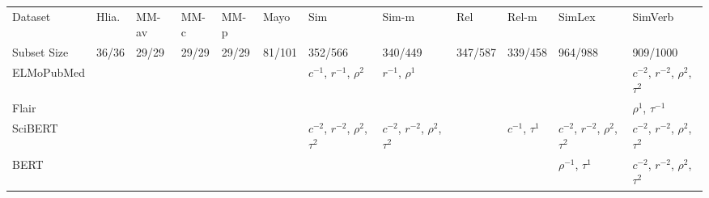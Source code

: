 \documentclass[letterpaper]{article} %
\begin{document}
\begin{sidewaystable*}
    \centering
    \small
    \begin{tabular}{l l l l l l l l l l l l}
    \toprule
         Dataset & Hlia. & MM-av & MM-c & MM-p & Mayo & Sim & Sim-m & Rel & Rel-m & SimLex & SimVerb\\ 
Subset Size & 36/36 & 29/29 & 29/29 & 29/29 & 81/101 & 352/566 & 340/449 & 347/587 & 339/458 & 964/988 & 909/1000\\
\midrule
\multirow{4}{1.5cm}{ELMoPubMed} & \multirow{4}{1.5cm}{} & \multirow{4}{1.5cm}{} & \multirow{4}{1.5cm}{} & \multirow{4}{1.5cm}{} & \multirow{4}{1.5cm}{} & \multirow{4}{1.5cm}{$c^{-1}$, $r^{-1}$, $\rho^{2}$} & \multirow{4}{1.5cm}{$r^{-1}$, $\rho^{1}$} & \multirow{4}{1.5cm}{} & \multirow{4}{1.5cm}{} & \multirow{4}{1.5cm}{} & \multirow{4}{1.5cm}{$c^{-2}$, $r^{-2}$, $\rho^{2}$, $\tau^{2}$} \\ \\ \\ \\
\midrule
\multirow{2}{1.5cm}{Flair} & \multirow{2}{1.5cm}{} & \multirow{2}{1.5cm}{} & \multirow{2}{1.5cm}{} & \multirow{2}{1.5cm}{} & \multirow{2}{1.5cm}{} & \multirow{2}{1.5cm}{} & \multirow{2}{1.5cm}{} & \multirow{2}{1.5cm}{} & \multirow{2}{1.5cm}{} & \multirow{2}{1.5cm}{} & \multirow{2}{1.5cm}{$\rho^{1}$, $\tau^{-1}$} \\ \\
\midrule
\multirow{4}{1.5cm}{SciBERT} & \multirow{4}{1.5cm}{} & \multirow{4}{1.5cm}{} & \multirow{4}{1.5cm}{} & \multirow{4}{1.5cm}{} & \multirow{4}{1.5cm}{} & \multirow{4}{1.5cm}{$c^{-2}$, $r^{-2}$, $\rho^{2}$, $\tau^{2}$} & \multirow{4}{1.5cm}{$c^{-2}$, $r^{-2}$, $\rho^{2}$, $\tau^{2}$} & \multirow{4}{1.5cm}{} & \multirow{4}{1.5cm}{$c^{-1}$, $\tau^{1}$} & \multirow{4}{1.5cm}{$c^{-2}$, $r^{-2}$, $\rho^{2}$, $\tau^{2}$} & \multirow{4}{1.5cm}{$c^{-2}$, $r^{-2}$, $\rho^{2}$, $\tau^{2}$} \\ \\ \\ \\
\midrule
\multirow{4}{1.5cm}{BERT} & \multirow{4}{1.5cm}{} & \multirow{4}{1.5cm}{} & \multirow{4}{1.5cm}{} & \multirow{4}{1.5cm}{} & \multirow{4}{1.5cm}{} & \multirow{4}{1.5cm}{} & \multirow{4}{1.5cm}{} & \multirow{4}{1.5cm}{} & \multirow{4}{1.5cm}{} & \multirow{4}{1.5cm}{$\rho^{-1}$, $\tau^{1}$} & \multirow{4}{1.5cm}{$c^{-2}$, $r^{-2}$, $\rho^{2}$, $\tau^{2}$} \\ \\ \\ \\

\end{tabular}
\end{sidewaystable*}
\end{document}
